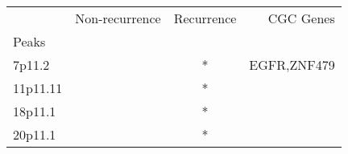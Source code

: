 \begin{tabular}{lccr}
\toprule
{} & Non-recurrence & Recurrence &    CGC Genes \\
Peaks    &                &            &              \\
\midrule
7p11.2   &                &          * &  EGFR,ZNF479 \\
11p11.11 &                &          * &              \\
18p11.1  &                &          * &              \\
20p11.1  &                &          * &              \\
\bottomrule
\end{tabular}
